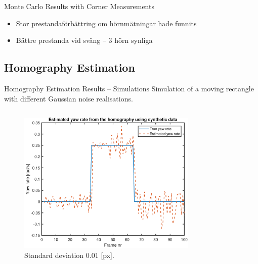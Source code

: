 \documentclass{beamer}
\renewcommand{\aa}{\"a\xspace}
\renewcommand{\o}{\"o\xspace}
\begin{document}
\begin{frame}{Monte Carlo Results with Corner Measurements}
	\note
	{
		\begin{itemize}
			\item Stor prestandaf\o{}rb\aa{}ttring om h\o{}rnm\aa{}tningar hade funnits
			\item B\aa{}ttre prestanda vid sv\aa{}ng -- 3 h\o{}rn synliga
		\end{itemize}
	}
\end{frame}

\subsection{Homography Estimation}

\begin{frame}{Homography Estimation Results -- Simulations}
	Simulation of a moving rectangle with different Gaussian noise realisations.
	\vspace{-1.5em}
	\begin{columns}[T]
	\begin{figure}
		\includegraphics[height=0.35\textheight]{Hom/rect_1e-2}
		\vspace{-1.25em}
		\caption{Standard deviation 0.01 [px].}
	\end{figure}
	\vspace{-2.5em}
	\begin{figure}

\end{figure}
\end{columns}
\end{frame}
\end{document}
